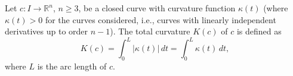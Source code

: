 Let $c: I \to \mathbb{R}^n$, $n \geq 3$, be a closed curve with curvature function $\kappa(t)$ (where $\kappa(t) > 0$ for the curves considered, i.e., curves with linearly independent derivatives up to order $n-1$). The total curvature $K(c)$ of $c$ is defined as
$$K(c) = \int_0^L |\kappa(t)|\,dt = \int_0^L \kappa(t)\,dt,$$
where $L$ is the arc length of $c$.